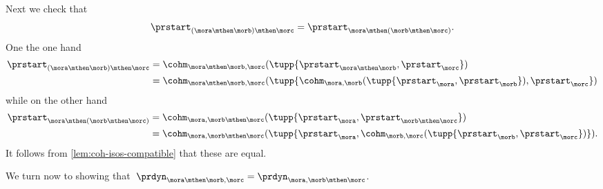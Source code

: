 Next we check that
\begin{equation*}
    \prstart_{(\mora \mthen \morb)\mthen \morc}  =\prstart_{\mora \mthen (\morb \mthen \morc)}.
\end{equation*}
One the one hand
\begin{align*}
    \prstart_{(\mora \mthen \morb)\mthen \morc} & = \cohm_{\mora \mthen \morb, \morc}( \tupp{\prstart_{\mora \mthen \morb}, \prstart_{\morc}}) \\
                                                & = \cohm_{\mora \mthen \morb, \morc}( \tupp{ \cohm_{\mora, \morb}( \tupp{\prstart_{\mora}, \prstart_{\morb}}), \prstart_{\morc}})
\end{align*}
while on the other hand
\begin{align*}
    \prstart_{\mora \mthen (\morb \mthen \morc)} & = \cohm_{\mora,\morb \mthen \morc}( \tupp{\prstart_{\mora}, \prstart_{\morb \mthen \morc}}) \\
                                                 & = \cohm_{\mora,\morb \mthen \morc}( \tupp{\prstart_{\mora}, \cohm_{\morb, \morc}( \tupp{\prstart_{\morb}, \prstart_{\morc}})}).
\end{align*}
It follows from \cref{lem:coh-isos-compatible} that these are equal.

We turn now to showing that~$\prdyn_{\mora \mthen \morb, \morc} = \prdyn_{\mora, \morb \mthen \morc}$.

